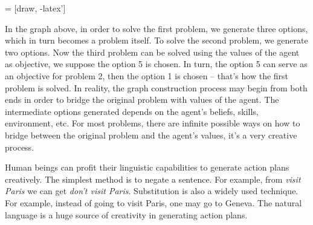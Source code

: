 \begin{center}
   = [draw, -latex']

\end{center}

In the graph above, in order to solve the first problem, we generate three options, which in turn becomes a problem itself. To solve the second problem, we generate two options. Now the third problem can be solved using the values of the agent as objective, we suppose the option 5 is chosen. In turn, the option 5 can serve as an objective for problem 2, then the option 1 is chosen -- that's how the first problem is solved. In reality, the graph construction process may begin from both ends in order to bridge the original problem with values of the agent. The intermediate options generated depends on the agent's beliefs, skills, environment, etc. For most problems, there are infinite possible ways on how to bridge between the original problem and the agent's values,  it's a very creative process.

Human beings can profit their linguistic capabilities to generate action plans creatively. The simplest method is to negate a sentence. For example, from \emph{visit Paris} we can get \emph{don’t visit Paris}. Substitution is also a widely used technique. For example, instead of going to visit Paris, one may go to Geneva. The natural language is a huge source of creativity in generating action plans.


